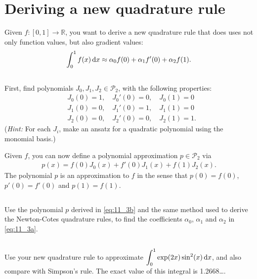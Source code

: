 \documentclass[11pt,letterpaper]{article}
\begin{document}
 

\section{Deriving a new quadrature rule}
Given $f:[0,1]\rightarrow \mathbb{R}$, you want to derive a new
  quadrature rule that does uses not only function values, but also
  gradient values:
\begin{align}
    \int_0^1 f(x)\,\mathrm{d} x \approx \alpha_0 f(0) + \alpha_1 f'(0) + \alpha_2 f(1). \label{eq:11_3a}
\end{align}
  
\subsection{}
First, find polynomials $J_0, J_1, J_2 \in \mathcal{P}_2$, with the
  following properties:
  \begin{align*}
    & J_0(0)=1,\quad J_0'(0)=0,\quad J_0(1)=0\\
    & J_1(0)=0,\quad J_1'(0)=1,\quad J_1(1)=0\\
    & J_2(0)=0,\quad J_2'(0)=0,\quad J_2(1)=1.
  \end{align*}
  ({\em Hint:} For each $J_i$, make an ansatz for a quadratic polynomial using the monomial basis.)

Given $f$, you can now define a polynomial approximation $p\in \mathcal{P}_2$ via 
\begin{align}
    p(x)=f(0)J_0(x)+f'(0)J_1(x)+f(1)J_2(x). \label{eq:11_3b}
\end{align}
The polynomial $p$ is an approximation to $f$ in the sense that
$p(0)=f(0)$, $p'(0)=f'(0)$ and $p(1)=f(1)$. 

\subsection{}
Use the polynomial
  $p$ derived in \eqref{eq:11_3b} and the same method used to derive the Newton-Cotes
  quadrature rules, to find the coefficients $\alpha_0$, $\alpha_1$ and
  $\alpha_2$ in \eqref{eq:11_3a}.
  
\subsection{}
Use your new quadrature rule to approximate
  $\displaystyle{\int_0^1\exp(2x)\sin^2(x)\,\mathrm{d}x}$, and also compare with
  Simpson's rule. The exact value of this integral is 1.2668\dots.
\end{document}
